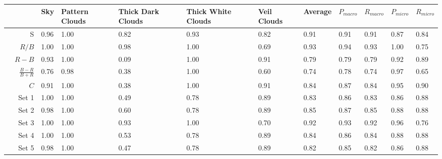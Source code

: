 \begin{table}[htb]
\scriptsize
\centering
\begin{tabular}{ |rr||L|L|L|L|L|L|L|L|L|L| }
\hline
& & Sky & Pattern Clouds & Thick Dark Clouds & Thick White Clouds & Veil Clouds & Average & $P_{macro}$ & $R_{macro}$ & $P_{micro}$ & $R_{micro}$ \\ 
\hline\hline
\parbox[t]{3mm}{} & S & 0.96 & 1.00 & 0.82 & 0.93 & 0.82 & 0.91 & 0.91 & 0.91 & 0.87 & 0.84 \\ %
&  $R/B$ & 1.00 & 1.00 & 0.98 & 1.00 & 0.69 & 0.93 & 0.94 & 0.93 & 1.00 & 0.75\\ %
& $R-B$ & 0.93 & 1.00 & 0.09 & 1.00 & 0.91 & 0.79 & 0.79 & 0.79 & 0.92 & 0.89 \\ %
& $\frac{B-R}{B+R}$ & 0.76 & 0.98 & 0.38 & 1.00 & 0.60 & 0.74 & 0.78 & 0.74 & 0.97 & 0.65 \\ %
& $C$ & 0.91 & 1.00 & 0.38 & 1.00 & 0.91 & 0.84 & 0.87 & 0.84 & 0.95 & 0.90 \\ %
\hline\hline
\parbox[t]{3mm}{} & Set 1 & 1.00& 1.00& 0.49 & 0.78 & 0.89 & 0.83 & 0.86 & 0.83 & 0.86 & 0.88 \\ %
& Set 2 & 0.98 & 1.00& 0.60 & 0.78 & 0.89 & 0.85 & 0.87 &	0.85 & 0.88 & 0.88\\ %
& Set 3 & 1.00 & 1.00 & 0.93 & 1.00 & 0.70 & 0.92 & 0.93 &	0.92 & 0.96 & 0.76\\ %
& Set 4 & 1.00& 1.00& 0.53 & 0.78 & 0.89 & 0.84 &	0.86 & 0.84 & 0.88 & 0.88 \\ %
& Set 5 & 0.98 & 1.00& 0.47 & 0.78 & 0.89 & 0.82 & 0.85 &	0.82 & 0.86 & 0.88 \\ %

\end{tabular}
\end{table}
